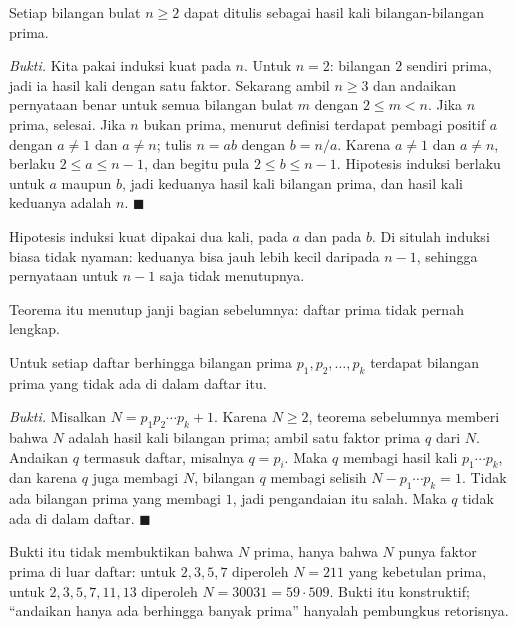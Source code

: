 \begin{teorema}
Setiap bilangan bulat $n \geq 2$ dapat ditulis sebagai hasil kali bilangan-bilangan
prima.
\end{teorema}
\par\smallskip\noindent\textit{Bukti.} Kita pakai induksi kuat pada $n$. Untuk $n = 2$:
bilangan $2$ sendiri prima, jadi ia hasil kali dengan satu faktor. Sekarang ambil
$n \geq 3$ dan andaikan pernyataan benar untuk semua bilangan bulat $m$ dengan
$2 \leq m < n$. Jika $n$ prima, selesai. Jika $n$ bukan prima, menurut definisi terdapat
pembagi positif $a$ dengan $a \neq 1$ dan $a \neq n$; tulis $n = ab$ dengan
$b = n/a$. Karena $a \neq 1$ dan $a \neq n$, berlaku $2 \leq a \leq n-1$, dan begitu
pula $2 \leq b \leq n-1$. Hipotesis induksi berlaku untuk $a$ maupun $b$, jadi keduanya
hasil kali bilangan prima, dan hasil kali keduanya adalah $n$.
\hfill$\blacksquare${\parfillskip=0pt\par}

Hipotesis induksi kuat dipakai dua kali, pada $a$ dan pada $b$. Di situlah induksi biasa
tidak nyaman: keduanya bisa jauh lebih kecil daripada $n-1$, sehingga pernyataan untuk
$n-1$ saja tidak menutupnya.

Teorema itu menutup janji bagian sebelumnya: daftar prima tidak pernah lengkap.

\begin{akibat}
Untuk setiap daftar berhingga bilangan prima $p_{1}, p_{2}, \dots, p_{k}$ terdapat
bilangan prima yang tidak ada di dalam daftar itu.
\end{akibat}
\par\smallskip\noindent\textit{Bukti.} Misalkan $N = p_{1}p_{2}\cdots p_{k} + 1$. Karena
$N \geq 2$, teorema sebelumnya memberi bahwa $N$ adalah hasil kali bilangan prima;
ambil satu faktor prima $q$ dari $N$. Andaikan $q$ termasuk daftar, misalnya
$q = p_{i}$. Maka $q$ membagi hasil kali $p_{1}\cdots p_{k}$, dan karena $q$ juga
membagi $N$, bilangan $q$ membagi selisih $N - p_{1}\cdots p_{k} = 1$. Tidak ada
bilangan prima yang membagi $1$, jadi pengandaian itu salah. Maka $q$ tidak ada di
dalam daftar.
\hfill$\blacksquare${\parfillskip=0pt\par}

Bukti itu tidak membuktikan bahwa $N$ prima, hanya bahwa $N$ punya faktor prima di luar
daftar: untuk $2,3,5,7$ diperoleh $N = 211$ yang kebetulan prima, untuk $2,3,5,7,11,13$
diperoleh $N = 30031 = 59 \cdot 509$. Bukti itu konstruktif; ``andaikan hanya ada
berhingga banyak prima'' hanyalah pembungkus retorisnya.

